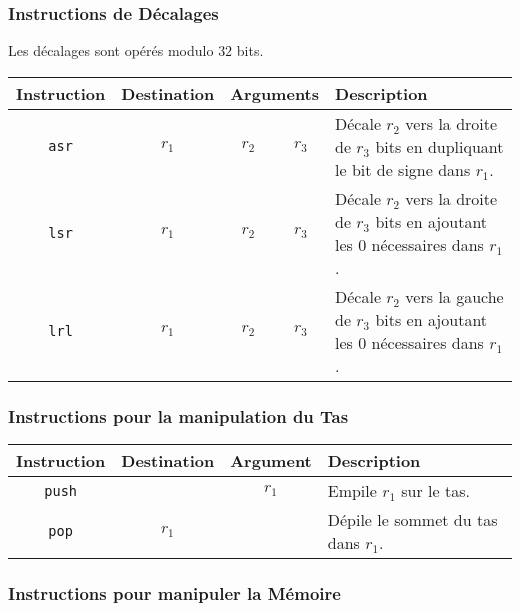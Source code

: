 \documentclass[french, 12pt]{article}
\begin{document}
\subsubsection*{Instructions de Décalages}

Les décalages sont opérés modulo $32$ bits.

\noindent
\begin{tabularx}{\textwidth}{cccc X}
      \toprule
      Instruction  & Destination & \multicolumn{2}{c}{Arguments} & Description                                                                                         \\
      \midrule
      \texttt{asr} & $r_1$       & $r_2$                         & $r_3$       & Décale $r_2$ vers la droite de $r_3$ bits en dupliquant le bit de signe dans $r_1$.   \\
      \texttt{lsr} & $r_1$       & $r_2$                         & $r_3$       & Décale $r_2$ vers la droite de $r_3$ bits en ajoutant les $0$ nécessaires dans $r_1$. \\
      \texttt{lrl} & $r_1$       & $r_2$                         & $r_3$       & Décale $r_2$ vers la gauche de $r_3$ bits en ajoutant les $0$ nécessaires dans $r_1$. \\
      \bottomrule
\end{tabularx}

\subsubsection*{Instructions pour la manipulation du Tas}

\noindent
\begin{tabularx}{\textwidth}{ccc X}
      \toprule
      Instruction   & Destination & Argument & Description                         \\
      \midrule
      \texttt{push} &             & $r_1$    & Empile $r_1$ sur le tas.            \\
      \texttt{pop}  & $r_1$       &          & Dépile le sommet du tas dans $r_1$. \\
      \bottomrule
\end{tabularx}

\subsubsection*{Instructions pour manipuler la Mémoire}
\end{document}
